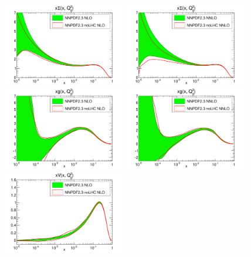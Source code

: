 \begin{figure}[hp!]
\centering
\includegraphics[width=0.48\textwidth]{6-LHCimpact/figs/xSinglet_Q_2_log-23-vs-23noLHC-nlo.pdf}
\includegraphics[width=0.48\textwidth]{6-LHCimpact/figs/xSinglet_Q_2_log-23-vs-23noLHC-nnlo.pdf}\\
\includegraphics[width=0.48\textwidth]{6-LHCimpact/figs/xg_Q_2_log-23-vs-23noLHC-nlo.pdf}
\includegraphics[width=0.48\textwidth]{6-LHCimpact/figs/xg_Q_2_log-23-vs-23noLHC-nnlo.pdf} \\
\includegraphics[width=0.48\textwidth]{6-LHCimpact/figs/xV_Q_2_log-23-vs-23noLHC-nlo.pdf}

\end{figure}
